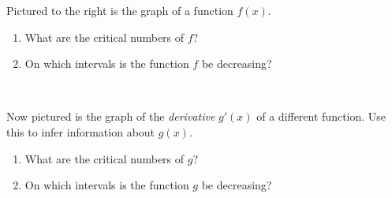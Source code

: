 \documentclass[10pt]{article}
\begin{document}
\begin{minipage}{0.55\textwidth}
  Pictured to the right is the graph of a function $f(x)$.
\begin{enumerate}
\item[(a)] What are the critical numbers of $f$?
\vspace{1.5cm}
\item[(b)] On which intervals is the function $f$ be decreasing?
\end{enumerate}
\end{minipage}
%
\begin{minipage}{0.45\textwidth}
\begin{center}
\end{center}
\end{minipage}\\[40pt]
\begin{minipage}{0.55\textwidth}
Now pictured is the graph of the \textit{derivative} $g'(x)$ of a different function. Use this to infer information about $g(x)$.
\begin{enumerate}
\item[(c)] What are the critical numbers of $g$?
\vspace{1.5cm}
\item[(d)] On which intervals is the function $g$ be decreasing?
\end{enumerate}
\end{minipage}
\end{document}
